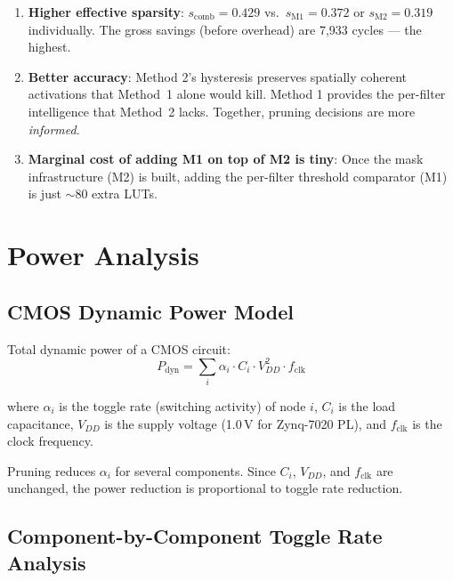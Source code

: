 \documentclass[11pt,a4paper]{article}
\begin{document}
\begin{enumerate}[nosep]
    \item \textbf{Higher effective sparsity}: $s_{\text{comb}} = 0.429$ vs.\
        $s_{\text{M1}} = 0.372$ or $s_{\text{M2}} = 0.319$ individually.
        The gross savings (before overhead) are 7,933 cycles — the highest.

    \item \textbf{Better accuracy}: Method 2's hysteresis preserves
        spatially coherent activations that Method~1 alone would kill.
        Method 1 provides the per-filter intelligence that Method~2 lacks.
        Together, pruning decisions are more \emph{informed}.

    \item \textbf{Marginal cost of adding M1 on top of M2 is tiny}:
        Once the mask infrastructure (M2) is built, adding the
        per-filter threshold comparator (M1) is just $\sim$80 extra LUTs.
\end{enumerate}

\section{Power Analysis}
\label{sec:power}

\subsection{CMOS Dynamic Power Model}

Total dynamic power of a CMOS circuit:
\begin{equation}
P_{\text{dyn}} = \sum_i \alpha_i \cdot C_i \cdot V_{DD}^2 \cdot f_{\text{clk}}
\end{equation}

where $\alpha_i$ is the toggle rate (switching activity) of node $i$,
$C_i$ is the load capacitance, $V_{DD}$ is the supply voltage (1.0\,V for
Zynq-7020 PL), and $f_{\text{clk}}$ is the clock frequency.

Pruning reduces $\alpha_i$ for several components.  Since $C_i$, $V_{DD}$,
and $f_{\text{clk}}$ are unchanged, the power reduction is proportional to
toggle rate reduction.

\subsection{Component-by-Component Toggle Rate Analysis}
\end{document}
